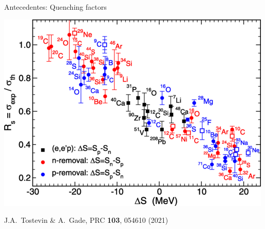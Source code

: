 \documentclass{beamer}
\begin{document}
\begin{frame}{Antecedentes: Quenching factors} 
    \begin{minipage}{0.45\textwidth}
    \begin{center}
    \includegraphics[height=0.4\textheight]{Tostevin.png}
    
    \tiny J.A.~Tostevin \& A.~Gade, PRC \textbf{103}, 054610 (2021)


\end{center}
\end{minipage}
\end{frame}
\end{document}
